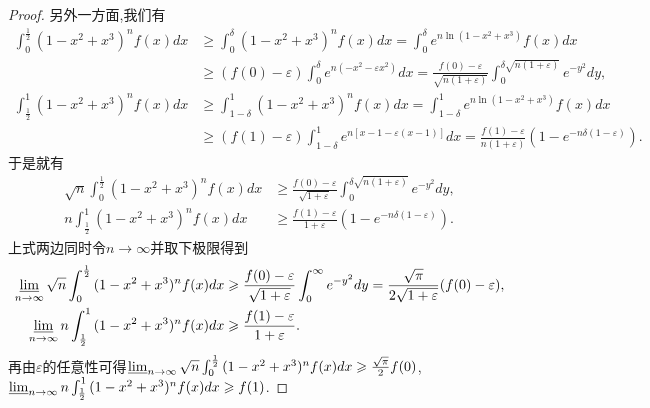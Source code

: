 \documentclass[../../main.tex]{subfiles}
\begin{document}
\begin{proof}
另外一方面,我们有
\begin{align*}
\int_0^{\frac{1}{2}}{(1 - x^2 + x^3)^nf(x)dx}&\geqslant \int_0^{\delta}{(1 - x^2 + x^3)^nf(x)dx}=\int_0^{\delta}{e^{n\ln(1 - x^2 + x^3)}f(x)dx}\\
&\geqslant (f(0) - \varepsilon)\int_0^{\delta}{e^{n(-x^2 - \varepsilon x^2)}dx}=\frac{f(0) - \varepsilon}{\sqrt{n(1 + \varepsilon)}}\int_0^{\delta\sqrt{n(1 + \varepsilon)}}{e^{-y^2}dy},
\end{align*}
\begin{align*}
\int_{\frac{1}{2}}^1{(1 - x^2 + x^3)^nf(x)dx}&\geqslant \int_{1 - \delta}^1{(1 - x^2 + x^3)^nf(x)dx}=\int_{1 - \delta}^1{e^{n\ln(1 - x^2 + x^3)}f(x)dx}\\
&\geqslant (f(1) - \varepsilon)\int_{1 - \delta}^1{e^{n[x - 1 - \varepsilon(x - 1)]}dx}=\frac{f(1) - \varepsilon}{n(1 + \varepsilon)}\left(1 - e^{-n\delta(1 - \varepsilon)}\right).
\end{align*}
于是就有
\begin{align*}
\sqrt{n}\int_0^{\frac{1}{2}}{(1 - x^2 + x^3)^nf(x)dx}&\geqslant \frac{f(0) - \varepsilon}{\sqrt{1 + \varepsilon}}\int_0^{\delta\sqrt{n(1 + \varepsilon)}}{e^{-y^2}dy},\\
n\int_{\frac{1}{2}}^1{(1 - x^2 + x^3)^nf(x)dx}&\geqslant \frac{f(1) - \varepsilon}{1 + \varepsilon}\left(1 - e^{-n\delta(1 - \varepsilon)}\right).
\end{align*}
上式两边同时令\(n\rightarrow\infty\)并取下极限得到
\begin{align*}
\varliminf_{n\rightarrow\infty}\sqrt{n}\int_0^{\frac{1}{2}}{(1 - x^2 + x^3)^nf(x)dx}&\geqslant \frac{f(0) - \varepsilon}{\sqrt{1 + \varepsilon}}\int_0^{\infty}{e^{-y^2}dy}=\frac{\sqrt{\pi}}{2\sqrt{1 + \varepsilon}}(f(0) - \varepsilon),\\
\varliminf_{n\rightarrow\infty}n\int_{\frac{1}{2}}^1{(1 - x^2 + x^3)^nf(x)dx}&\geqslant \frac{f(1) - \varepsilon}{1 + \varepsilon}.
\end{align*}
再由\(\varepsilon\)的任意性可得\(\varliminf_{n\rightarrow\infty}\sqrt{n}\int_0^{\frac{1}{2}}{(1 - x^2 + x^3)^nf(x)dx}\geqslant \frac{\sqrt{\pi}}{2}f(0)\),\(\varliminf_{n\rightarrow\infty}n\int_{\frac{1}{2}}^1{(1 - x^2 + x^3)^nf(x)dx}\geqslant f(1)\).


\end{proof}
\end{document}
